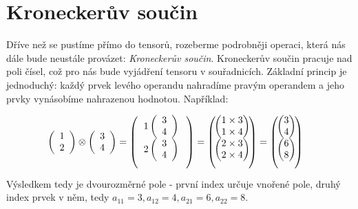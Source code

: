 \documentclass[a5paper,12pt]{amsbook}
\theoremstyle{definition}
\begin{document}
\section{Kroneckerův součin}

\noindent
Dříve než se pustíme přímo do tensorů, rozeberme podrobněji operaci, která nás dále bude neustále provázet:
\textit{Kroneckerův součin}. Kroneckerův součin pracuje nad poli čísel, což pro nás bude vyjádření tensoru
v souřadnicích. Základní princip je jednoduchý: každý prvek levého operandu nahradíme pravým operandem a jeho
prvky vynásobíme nahrazenou hodnotou. Například:

\begin{equation*}
\begin{split}
& \left(\begin{array}{c}1 \\ 2\end{array}\right)\otimes\left(\begin{array}{c}3 \\ 4\end{array}\right) =
\left(\begin{blockarray}{c}
\begin{block}{c}
1 \left(\begin{array}{c}3 \\ 4\end{array}\right) \\
2 \left(\begin{array}{c}3 \\ 4\end{array}\right) \\
\end{block}
\end{blockarray}\right) =
\left(\begin{blockarray}{c}
\begin{block}{(c)}
1 \times 3 \\
1 \times 4 \\
\end{block}
\begin{block}{(c)}
2 \times 3 \\
2 \times 4 \\
\end{block}
\end{blockarray}\right) =
\left(\begin{blockarray}{c}
\begin{block}{(c)}
3 \\
4 \\
\end{block}
\begin{block}{(c)}
6 \\
8 \\
\end{block}
\end{blockarray}\right)
\end{split}
\end{equation*}
Výsledkem tedy je dvourozměrné pole - první index určuje vnořené pole, druhý index prvek v něm, tedy
$a_{11} = 3, a_{12} = 4, a_{21} = 6, a_{22} = 8$.
\end{document}
